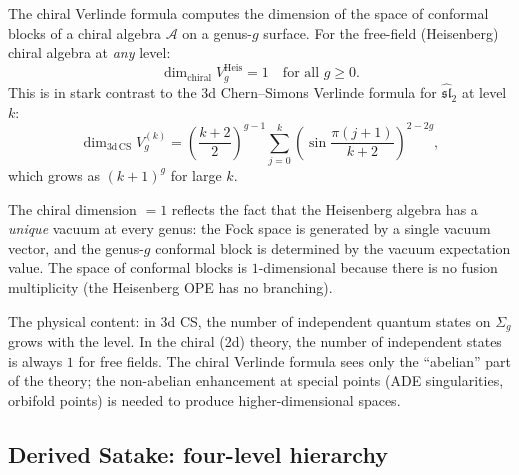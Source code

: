 \documentclass[11pt]{article}
\newcommand{\cA}{\mathcal{A}}
\begin{document}
\begin{observation}[Chiral Verlinde: $\dim = 1$ for free field at all genera]
\label{obs:chiral-verlinde}
The chiral Verlinde formula computes the dimension of the space of
conformal blocks of a chiral algebra $\cA$ on a genus-$g$ surface.
For the free-field (Heisenberg) chiral algebra at \emph{any} level:
\[
 \dim_{\mathrm{chiral}} V_{g}^{\mathrm{Heis}} = 1 \quad \text{for all } g \geq 0.
\]
This is in stark contrast to the 3d Chern--Simons Verlinde formula
for $\widehat{\mathfrak{sl}}_2$ at level $k$:
\[
 \dim_{\mathrm{3d\,CS}} V_{g}^{(k)} = \left( \frac{k+2}{2} \right)^{g-1}
 \sum_{j=0}^{k} \left( \sin \frac{\pi(j+1)}{k+2} \right)^{2-2g},
\]
which grows as $(k+1)^g$ for large $k$.

The chiral dimension $= 1$ reflects the fact that the Heisenberg
algebra has a \emph{unique} vacuum at every genus: the Fock space
is generated by a single vacuum vector, and the genus-$g$ conformal
block is determined by the vacuum expectation value. The space of
conformal blocks is $1$-dimensional because there is no fusion
multiplicity (the Heisenberg OPE has no branching).

The physical content: in 3d CS, the number of independent
quantum states on $\Sigma_g$ grows with the level. In the chiral
(2d) theory, the number of independent states is always $1$ for
free fields. The chiral Verlinde formula sees only the ``abelian''
part of the theory; the non-abelian enhancement at special points
(ADE singularities, orbifold points) is needed to produce
higher-dimensional spaces.
\end{observation}

\subsection{Derived Satake: four-level hierarchy}
\label{subsec:derived-satake}
\end{document}
